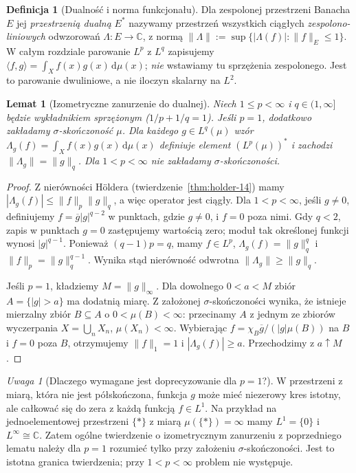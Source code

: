 \documentclass[11pt,a4paper,oneside]{book}
\numberwithin{equation}{chapter}
\theoremstyle{plain}
\newtheorem{lemat}[twierdzenie]{Lemat}
\theoremstyle{definition}
\newtheorem{definicja}[twierdzenie]{Definicja}
\theoremstyle{remark}
\newtheorem{uwaga}[twierdzenie]{Uwaga}
\begin{document}
\begin{definicja}[Dualność i norma funkcjonału]
\label{def:dual-lp-15}
Dla zespolonej przestrzeni Banacha $E$ jej \emph{przestrzenią dualną}
$E^*$ nazywamy przestrzeń wszystkich ciągłych \emph{zespolono-liniowych}
odwzorowań $\Lambda:E\to\mathbb C$, z normą
$\|\Lambda\|:=\sup\{|\Lambda(f)|:\|f\|_E\le1\}$.
W całym rozdziale parowanie $L^p$ z $L^q$ zapisujemy
$\langle f,g\rangle=\int_X f(x)g(x)\,\mathrm d\mu(x)$;
\emph{nie} wstawiamy tu sprzężenia zespolonego. Jest to parowanie
dwuliniowe, a nie iloczyn skalarny na $L^2$.
\end{definicja}

\begin{lemat}[Izometryczne zanurzenie do dualnej]
\label{lem:canonical-lpq-15}
Niech $1\le p<\infty$ i $q\in(1,\infty]$ będzie wykładnikiem
sprzężonym ($1/p+1/q=1$). Jeśli $p=1$, dodatkowo
zakładamy $\sigma$-skończoność $\mu$. Dla każdego $g\in L^q(\mu)$ wzór
$\Lambda_g(f)=\int_X f(x)g(x)\,\mathrm d\mu(x)$ definiuje element
$(L^p(\mu))^*$ i zachodzi $\|\Lambda_g\|=\|g\|_q$.
Dla $1<p<\infty$ nie zakładamy $\sigma$-skończoności.
\end{lemat}
\begin{proof}
Z nierówności Höldera (twierdzenie~\ref{thm:holder-14}) mamy
$|\Lambda_g(f)|\le\|f\|_p\|g\|_q$, a więc operator jest ciągły.
Dla $1<p<\infty$, jeśli $g\ne0$, definiujemy
$f=\overline{g}|g|^{q-2}$ w punktach, gdzie $g\ne0$, i $f=0$
poza nimi. Gdy $q<2$, zapis w punktach $g=0$ zastępujemy wartością zero;
moduł tak określonej funkcji wynosi $|g|^{q-1}$.
Ponieważ $(q-1)p=q$, mamy $f\in L^p$,
$\Lambda_g(f)=\|g\|_q^q$ i $\|f\|_p=\|g\|_q^{q-1}$.
Wynika stąd nierówność odwrotna $\|\Lambda_g\|\ge\|g\|_q$.

Jeśli $p=1$, kładziemy $M=\|g\|_\infty$. Dla dowolnego
$0<a<M$ zbiór $A=\{|g|>a\}$ ma dodatnią miarę.
Z założonej $\sigma$-skończoności wynika, że istnieje
mierzalny zbiór $B\subseteq A$ o $0<\mu(B)<\infty$:
przecinamy $A$ z jednym ze zbiorów wyczerpania
$X=\bigcup_nX_n$, $\mu(X_n)<\infty$.
Wybierając $f=\chi_B\overline g/(|g|\mu(B))$ na $B$
i $f=0$ poza $B$, otrzymujemy $\|f\|_1=1$ i
$|\Lambda_g(f)|\ge a$. Przechodzimy z $a\uparrow M$.
\end{proof}

\begin{uwaga}[Dlaczego wymagane jest doprecyzowanie dla $p=1$?]
W przestrzeni z miarą, która nie jest półskończona, funkcja $g$
może mieć niezerowy kres istotny, ale całkować się do zera
z każdą funkcją $f\in L^1$. Na przykład na jednoelementowej
przestrzeni $\{*\}$ z miarą $\mu(\{*\})=\infty$ mamy
$L^1=\{0\}$ i $L^\infty\cong\mathbb C$.
Zatem ogólne twierdzenie o izometrycznym zanurzeniu z poprzedniego
lematu należy dla $p=1$ rozumieć tylko przy założeniu
$\sigma$-skończoności. Jest to istotna granica twierdzenia;
przy $1<p<\infty$ problem nie występuje.
\end{uwaga}
\end{document}
